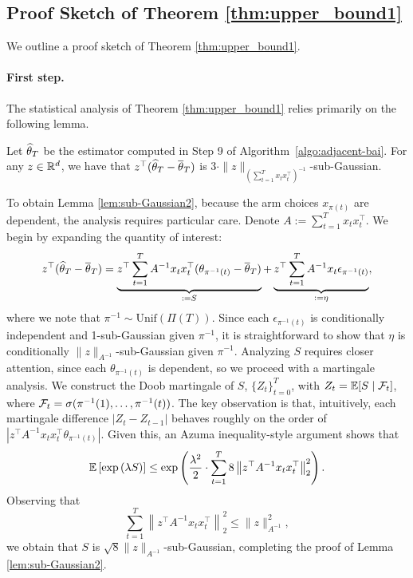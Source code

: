 \subsection{Proof Sketch of Theorem \ref{thm:upper_bound1}}
We outline a proof sketch of Theorem \ref{thm:upper_bound1}.
\paragraph{First step.} The statistical analysis of Theorem \ref{thm:upper_bound1} relies primarily on the following lemma.\begin{lemma}
    \label{lem:sub-Gaussian2}
    Let $\widehat{\theta}_T$ be the estimator computed in Step 9 of Algorithm~\ref{algo:adjacent-bai}. For any $z \in \mathbb{R}^d$, we have that $z^\top(\widehat{\theta}_T -\overline{\theta}_T)$ is $3\cdot\|z\|_{\left(\sum_{t=1}^Tx_tx_t^\top\right)^{-1}}$-sub-Gaussian.
\end{lemma}

To obtain Lemma \ref{lem:sub-Gaussian2}, because the arm choices $x_{\pi(t)}$ are dependent, the analysis requires particular care. Denote $A := \sum_{t=1}^Tx_tx_t^\top$. We begin by expanding the quantity of interest:
\begin{equation}
    z^\top(\widehat{\theta}_T -\overline{\theta}_T) =\underbrace{z^\top\sum_{t=1}^TA^{-1}x_tx_t^\top(\theta_{\pi^{-1}(t)} - \overline{\theta}_{T})}_{:=S} + \underbrace{z^\top\sum_{t=1}^TA^{-1}x_{t}\epsilon_{\pi^{-1}(t)}}_{:=\eta},
\end{equation}
where we note that $\pi^{-1} \sim \mathrm{Unif}(\Pi(T))$. Since each $\epsilon_{\pi^{-1}(t)}$ is conditionally independent and 1-sub-Gaussian given $\pi^{-1}$, it is straightforward to show that $\eta$ is conditionally $\|z\|_{A^{-1}}$-sub-Gaussian given $\pi^{-1}$. Analyzing $S$ requires closer attention, since each $\theta_{\pi^{-1}(t)}$ is dependent, so we proceed with a martingale analysis. We construct the Doob martingale of $S$, $\{Z_t\}_{t=0}^{T}$, with $Z_t = \mathbb{E}[S \mid \mathcal{F}_t]$, where $\mathcal{F}_{t} = \sigma(\pi^{-1}(1), \dots, \pi^{-1}(t))$. The key observation is that, intuitively, each martingale difference $|Z_t - Z_{t-1}|$ behaves roughly on the order of $\left|z^\top A^{-1}x_tx_t^\top\theta_{\pi^{-1}(t)}\right|$. Given this, an Azuma inequality-style argument shows that \begin{equation}\mathbb{E}\left[\exp\left(\lambda S\right)\right] \leq \exp\left(\frac{\lambda^2}{2} \cdot  \sum_{t=1}^T8  \left\|z^\top A^{-1}x_tx_t^\top\right\|_2^2\right).
\end{equation}
Observing that 
\begin{equation}
\sum_{t=1}^{T}\left\|z^\top A^{-1}x_tx_t^\top\right\|_2^2 \leq  \|z\|_{A^{-1}}^2,
\end{equation}
we obtain that $S$ is $\sqrt{8}\|z\|_{A^{-1}}$-sub-Gaussian, completing the proof of Lemma \ref{lem:sub-Gaussian2}.
